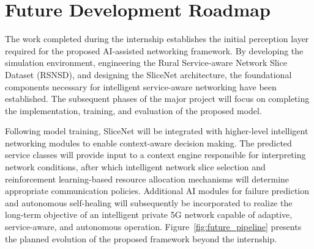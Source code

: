 \documentclass[12pt,a4paper]{report}
\begin{document}
	\section{Future Development Roadmap}
	\label{sec:future}
	
	The work completed during the internship establishes the initial perception layer required for the proposed AI-assisted networking framework. By developing the simulation environment, engineering the Rural Service-aware Network Slice Dataset (RSNSD), and designing the SliceNet architecture, the foundational components necessary for intelligent service-aware networking have been established. The subsequent phases of the major project will focus on completing the implementation, training, and evaluation of the proposed model.
	
	Following model training, SliceNet will be integrated with higher-level intelligent networking modules to enable context-aware decision making. The predicted service classes will provide input to a context engine responsible for interpreting network conditions, after which intelligent network slice selection and reinforcement learning-based resource allocation mechanisms will determine appropriate communication policies. Additional AI modules for failure prediction and autonomous self-healing will subsequently be incorporated to realize the long-term objective of an intelligent private 5G network capable of adaptive, service-aware, and autonomous operation. Figure~\ref{fig:future_pipeline} presents the planned evolution of the proposed framework beyond the internship.
	
\end{document}
